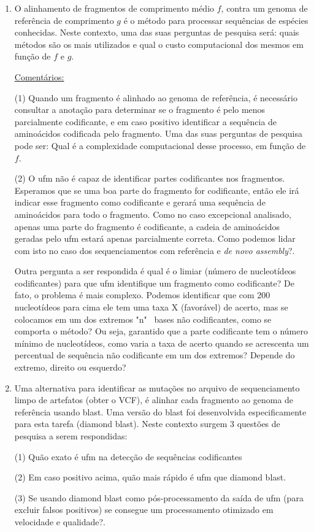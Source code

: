 \documentclass[12pt]{article}
\begin{document}
\begin{itemize}
\begin{enumerate}
        \item O alinhamento de fragmentos de comprimento médio $f$, contra um genoma de referência de comprimento $g$ é o método para processar sequências de espécies conhecidas. Neste contexto, uma das suas perguntas de pesquisa será: quais métodos são os mais utilizados e qual o custo computacional dos mesmos em função de $f$ e $g$.
        
        \underline{Comentários:}
        
        (1) Quando um fragmento é alinhado ao genoma de referência, é necessário consultar a anotação para determinar se o fragmento é pelo menos parcialmente codificante, e em caso positivo identificar a sequência de aminoácidos codificada pelo fragmento. Uma das suas perguntas de pesquisa pode ser: Qual é a complexidade computacional desse processo, em função de $f$. 
        
        (2) O \gls{ufm} não é capaz de identificar partes codificantes nos fragmentos. Esperamos que se uma boa parte do fragmento for codificante, então ele irá indicar esse fragmento como codificante e gerará uma sequência de aminoácidos para todo o fragmento. Como no caso excepcional analisado, apenas uma parte do fragmento é codificante, a cadeia de aminoácidos geradas pelo \gls{ufm} estará apenas parcialmente correta. Como podemos lidar com isto no caso dos sequenciamentos com referência e {\it{de novo assembly}}?. 
        
        Outra pergunta a ser respondida é qual é o limiar (número de nucleotídeos codificantes) para que \gls{ufm} identifique um fragmento como codificante? De fato, o problema é mais complexo. Podemos identificar que com 200 nucleotídeos para cima ele tem uma taxa X (favorável) de acerto, mas se colocamos em um dos extremos "n" \  bases não codificantes, como se comporta o método? Ou seja, garantido que a parte codificante tem o número mínimo de nucleotídeos, como varia a taxa de acerto quando se acrescenta um percentual de sequência não codificante em um dos extremos? Depende do extremo, direito ou esquerdo?
        
        \item Uma alternativa para identificar as mutações no arquivo de sequenciamento limpo de artefatos (obter o VCF), é alinhar cada fragmento ao genoma de referência usando blast. Uma versão do blast foi desenvolvida especificamente para esta tarefa (diamond  blast). Neste contexto surgem 3 questões de pesquisa a serem respondidas:
        
        (1) Quão exato é \gls{ufm} na detecção de sequências codificantes
        
        (2) Em caso positivo acima, quão mais rápido é \gls{ufm} que diamond blast.
        
        (3) Se usando diamond blast como pós-processamento da saída de \gls{ufm} (para excluir falsos positivos)  se consegue um processamento otimizado em velocidade e qualidade?.
        
    \end{enumerate}
    
\end{itemize}
\end{document}
